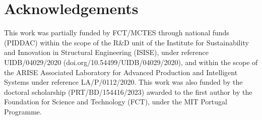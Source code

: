 \section{Acknowledgements}
\label{sec:acknowledgements}

This work was partially funded by FCT/MCTES through national funds (PIDDAC) within the scope of the R\&D unit of the Institute for Sustainability and Innovation in Structural Engineering (ISISE), under reference UIDB/04029/2020 (doi.org/10.54499/UIDB/04029/2020), and within the scope of the ARISE Associated Laboratory for Advanced Production and Intelligent Systems under reference LA/P/0112/2020. This work was also funded by the doctoral scholarship (PRT/BD/154416/2023) awarded to the first author by the Foundation for Science and Technology (FCT), under the MIT Portugal Programme.